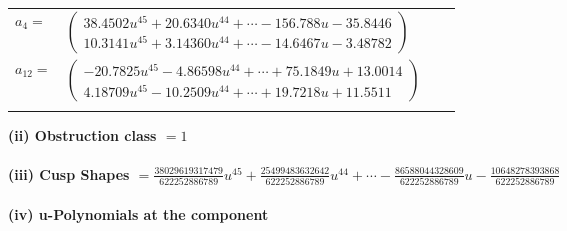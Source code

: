 \documentclass[1p]{elsarticle_modified}
\theoremstyle{definition}
\begin{document}
\begin{tabular}{m{7pt} m{180pt} m{7pt} m{180pt} }
\flushright $a_{4}=$&$\begin{pmatrix}38.4502 u^{45}+20.6340 u^{44}+\cdots-156.788 u-35.8446\\10.3141 u^{45}+3.14360 u^{44}+\cdots-14.6467 u-3.48782\end{pmatrix}$ \\
\flushright $a_{12}=$&$\begin{pmatrix}-20.7825 u^{45}-4.86598 u^{44}+\cdots+75.1849 u+13.0014\\4.18709 u^{45}-10.2509 u^{44}+\cdots+19.7218 u+11.5511\end{pmatrix}$\\&\end{tabular}
\flushleft \textbf{(ii) Obstruction class $= 1$}\\~\\
\flushleft \textbf{(iii) Cusp Shapes $= \frac{38029619317479}{622252886789} u^{45}+\frac{25499483632642}{622252886789} u^{44}+\cdots-\frac{86588044328609}{622252886789} u-\frac{10648278393868}{622252886789}$}\\~\\
\newpage\renewcommand{\arraystretch}{1}
\flushleft \textbf{(iv) u-Polynomials at the component}\newline \\
\end{document}
